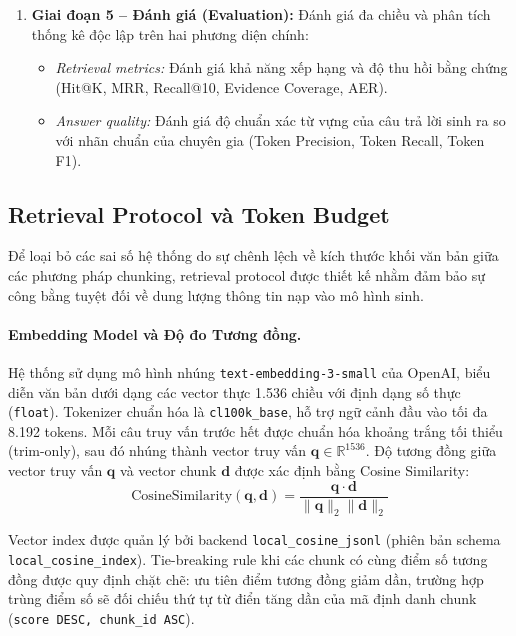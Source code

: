 \begin{enumerate}
    \item \textbf{Giai đoạn 5 -- Đánh giá (Evaluation):} Đánh giá đa chiều và phân tích thống kê độc lập trên hai phương diện chính:
    \begin{itemize}
        \item \textit{Retrieval metrics:} Đánh giá khả năng xếp hạng và độ thu hồi bằng chứng (Hit@K, MRR, Recall@10, Evidence Coverage, AER).
        \item \textit{Answer quality:} Đánh giá độ chuẩn xác từ vựng của câu trả lời sinh ra so với nhãn chuẩn của chuyên gia (Token Precision, Token Recall, Token F1).
    \end{itemize}
\end{enumerate}

\subsection{Retrieval Protocol và Token Budget}
\label{subsec:retrieval_protocol}

Để loại bỏ các sai số hệ thống do sự chênh lệch về kích thước khối văn bản giữa các phương pháp chunking, retrieval protocol được thiết kế nhằm đảm bảo sự công bằng tuyệt đối về dung lượng thông tin nạp vào mô hình sinh.

\paragraph{Embedding Model và Độ đo Tương đồng.}
Hệ thống sử dụng mô hình nhúng \texttt{text-embedding-3-small} của OpenAI, biểu diễn văn bản dưới dạng các vector thực 1.536 chiều với định dạng số thực (\texttt{float}). Tokenizer chuẩn hóa là \texttt{cl100k\_base}, hỗ trợ ngữ cảnh đầu vào tối đa 8.192 tokens. Mỗi câu truy vấn trước hết được chuẩn hóa khoảng trắng tối thiểu (trim-only), sau đó nhúng thành vector truy vấn $\mathbf{q} \in \mathbb{R}^{1536}$. Độ tương đồng giữa vector truy vấn $\mathbf{q}$ và vector chunk $\mathbf{d}$ được xác định bằng Cosine Similarity:
\begin{equation}
\text{CosineSimilarity}(\mathbf{q}, \mathbf{d}) = \frac{\mathbf{q} \cdot \mathbf{d}}{\|\mathbf{q}\|_2 \|\mathbf{d}\|_2}
\label{eq:cosine_similarity}
\end{equation}

Vector index được quản lý bởi backend \texttt{local\_cosine\_jsonl} (phiên bản schema \texttt{local\_cosine\_index}). Tie-breaking rule khi các chunk có cùng điểm số tương đồng được quy định chặt chẽ: ưu tiên điểm tương đồng giảm dần, trường hợp trùng điểm số sẽ đối chiếu thứ tự từ điển tăng dần của mã định danh chunk (\texttt{score DESC, chunk\_id ASC}).

